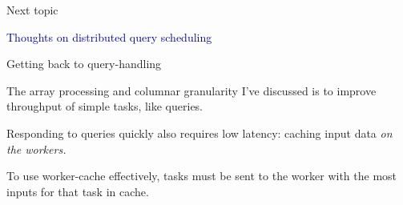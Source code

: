 \documentclass[aspectratio=169]{beamer}
\begin{document}
\begin{frame}{Next topic}
\Large
\vspace{1 cm}
\begin{center}
\textcolor{darkblue}{Thoughts on distributed query scheduling}
\end{center}
\end{frame}

\begin{frame}{Getting back to query-handling}
\large
\vspace{0.5 cm}
\begin{center}
\begin{minipage}{0.75\linewidth}
The array processing and columnar granularity I've discussed is to improve throughput of simple tasks, like queries.

\vspace{0.75 cm}
Responding to queries quickly also requires low latency: caching input data {\it on the workers.}

\vspace{0.75 cm}
To use worker-cache effectively, tasks must be sent to the worker with the most inputs for that task in cache.
\end{minipage}
\end{center}
\end{frame}
\end{document}
